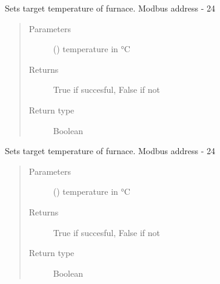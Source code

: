 \documentclass[letterpaper,10pt,english]{sphinxmanual}
\begin{document}
\begin{fulllineitems}
\begin{fulllineitems}
\end{fulllineitems}


\begin{fulllineitems}
\label{\detokenize{drivers:drivers.Furnace.setpoint_1}}
Sets target temperature of furnace.
Modbus address - 24
\begin{quote}\begin{description}
\item[{Parameters}] \leavevmode
{} (\sphinxstyleliteralemphasis{\sphinxupquote{, }}) \textendash{} temperature in °C

\item[{Returns}] \leavevmode
True if succesful, False if not

\item[{Return type}] \leavevmode
Boolean

\end{description}\end{quote}

\end{fulllineitems}


\begin{fulllineitems}
\label{\detokenize{drivers:drivers.Furnace.setpoint_2}}
Sets target temperature of furnace.
Modbus address - 24
\begin{quote}\begin{description}
\item[{Parameters}] \leavevmode
{} (\sphinxstyleliteralemphasis{\sphinxupquote{, }}) \textendash{} temperature in °C

\item[{Returns}] \leavevmode
True if succesful, False if not

\item[{Return type}] \leavevmode
Boolean

\end{description}\end{quote}

\end{fulllineitems}


\end{fulllineitems}
\end{document}
